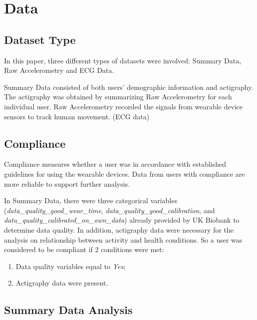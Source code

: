 \documentclass[12pt]{article}
\providecommand{\tightlist}{%
  \setlength{\itemsep}{0pt}\setlength{\parskip}{0pt}}
\begin{document}
\section{Data}
\label{sec:data}

\hypertarget{dataset-type}{%
\subsection{Dataset Type}\label{dataset-type}}

In this paper, three different types of datasets were involved: Summary
Data, Raw Accelerometry and ECG Data.

Summary Data consisted of both users' demographic information and
actigraphy. The actigraphy was obtained by summarizing Raw Accelerometry
for each individual user. Raw Accelerometry recorded the signals from
wearable device sensors to track human movement. (ECG data)

\hypertarget{compliance}{%
\subsection{Compliance}\label{compliance}}

Compliance measures whether a user was in accordance with established
guidelines for using the wearable devices. Data from users with
compliance are more reliable to support further analysis.

In Summary Data, there were three categorical variables
(\emph{data\_quality\_good\_wear\_time},
\emph{data\_quality\_good\_calibration}, and
\emph{data\_quality\_calibrated\_on\_own\_data}) already provided by UK
Biobank to determine data quality. In addition, actigraphy data were
necessary for the analysis on relationship between activity and health
conditions. So a user was considered to be compliant if 2 conditions
were met:

\begin{enumerate}
\def\labelenumi{\arabic{enumi}.}
\tightlist
\item
  Data quality variables equal to \emph{Yes};
\item
  Actigraphy data were present.
\end{enumerate}

\hypertarget{summary-data-analysis}{%
\subsection{Summary Data Analysis}\label{summary-data-analysis}}
\end{document}
